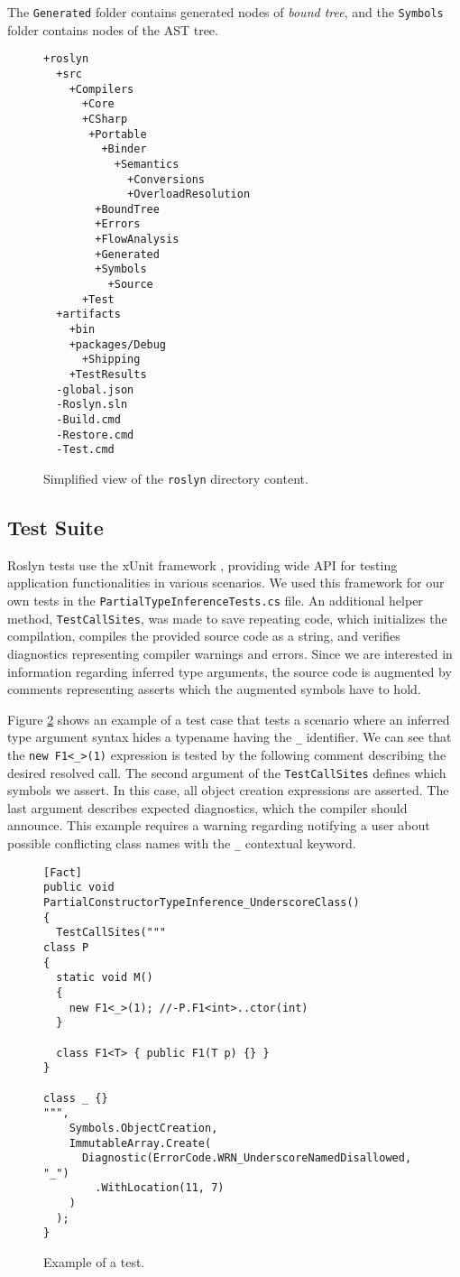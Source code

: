 The \texttt{Generated} folder contains generated nodes of \textit{bound tree}, and the \texttt{Symbols} folder contains nodes of the AST tree.
\begin{figure}[h]
\begin{lstlisting}
+roslyn
  +src
    +Compilers
      +Core
      +CSharp
       +Portable
         +Binder
           +Semantics
             +Conversions
             +OverloadResolution
        +BoundTree
        +Errors
        +FlowAnalysis
        +Generated
        +Symbols
          +Source
      +Test
  +artifacts
    +bin
    +packages/Debug
      +Shipping
    +TestResults
  -global.json
  -Roslyn.sln
  -Build.cmd
  -Restore.cmd
  -Test.cmd
\end{lstlisting}
\caption{Simplified view of the \texttt{roslyn} directory content.}
\label{img68:roslynFolder}
\end{figure}

\subsection{Test Suite}

Roslyn tests use the xUnit framework \cite{online:xUnit}, providing wide API for testing application functionalities in various scenarios. 
We used this framework for our own tests in the \texttt{PartialTypeInferenceTests.cs} file. 
An additional helper method, \texttt{TestCallSites}, was made to save repeating code, which initializes the compilation, compiles the provided source code as a string, and verifies diagnostics representing compiler warnings and errors. 
Since we are interested in information regarding inferred type arguments, the source code is augmented by comments representing asserts which the augmented symbols have to hold.
\par
Figure \ref{img69:test} shows an example of a test case that tests a scenario where an inferred type argument syntax hides a typename having the \texttt{\_}  identifier. 
We can see that the \texttt{new F1<\_>(1)} expression is tested by the following comment describing the desired resolved call. 
The second argument of the \texttt{TestCallSites} defines which symbols we assert. 
In this case, all object creation expressions are asserted. The last argument describes expected diagnostics, which the compiler should announce. 
This example requires a warning regarding notifying a user about possible conflicting class names with the \texttt{\_} contextual keyword.
\begin{figure}[h]
\begin{lstlisting}[style=csharp, showstringspaces=false]
[Fact]
public void PartialConstructorTypeInference_UnderscoreClass()
{
  TestCallSites("""
class P
{
  static void M() 
  {
    new F1<_>(1); //-P.F1<int>..ctor(int)
  }

  class F1<T> { public F1(T p) {} }
}

class _ {}
""",
    Symbols.ObjectCreation,
    ImmutableArray.Create(
      Diagnostic(ErrorCode.WRN_UnderscoreNamedDisallowed, "_")
        .WithLocation(11, 7)
    )
  );
}
\end{lstlisting}
\caption{Example of a test.}
\label{img69:test}
\end{figure}

